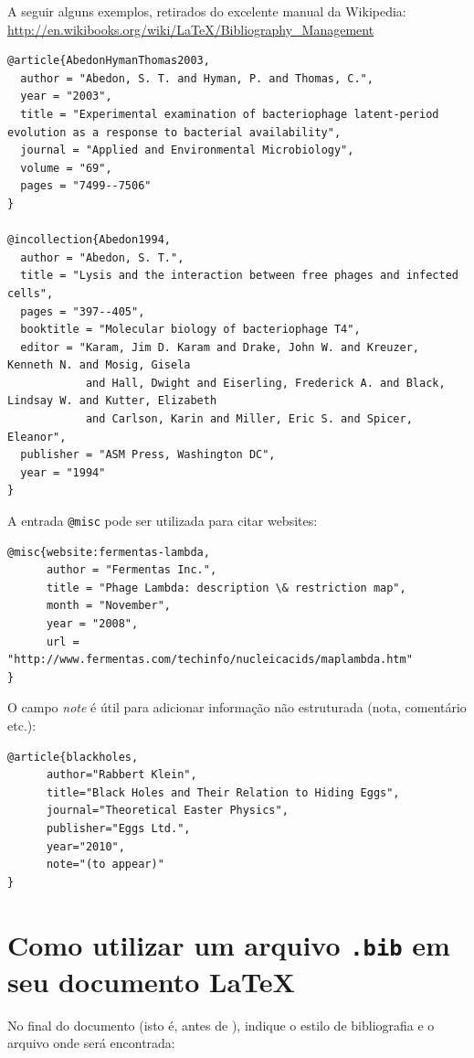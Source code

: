 A seguir alguns exemplos, retirados do excelente manual da Wikipedia: \url{http://en.wikibooks.org/wiki/LaTeX/Bibliography_Management}

\begin{verbatim}
@article{AbedonHymanThomas2003,
  author = "Abedon, S. T. and Hyman, P. and Thomas, C.",
  year = "2003",
  title = "Experimental examination of bacteriophage latent-period evolution as a response to bacterial availability",
  journal = "Applied and Environmental Microbiology",
  volume = "69",
  pages = "7499--7506"
}

@incollection{Abedon1994,
  author = "Abedon, S. T.",
  title = "Lysis and the interaction between free phages and infected cells",
  pages = "397--405",
  booktitle = "Molecular biology of bacteriophage T4",
  editor = "Karam, Jim D. Karam and Drake, John W. and Kreuzer, Kenneth N. and Mosig, Gisela
            and Hall, Dwight and Eiserling, Frederick A. and Black, Lindsay W. and Kutter, Elizabeth
            and Carlson, Karin and Miller, Eric S. and Spicer, Eleanor",
  publisher = "ASM Press, Washington DC",
  year = "1994"
}
\end{verbatim}

A entrada \verb+@misc+ pode ser utilizada para citar websites:

\begin{verbatim}
@misc{website:fermentas-lambda,
      author = "Fermentas Inc.",
      title = "Phage Lambda: description \& restriction map",
      month = "November",
      year = "2008",
      url = "http://www.fermentas.com/techinfo/nucleicacids/maplambda.htm"
}
\end{verbatim}

O campo \textit{note} é útil para adicionar informação não estruturada (nota, comentário etc.):

\begin{verbatim}
@article{blackholes,
      author="Rabbert Klein",
      title="Black Holes and Their Relation to Hiding Eggs",
      journal="Theoretical Easter Physics",
      publisher="Eggs Ltd.",
      year="2010",
      note="(to appear)"
}
\end{verbatim}

\section{Como utilizar um arquivo \texttt{.bib} em seu documento \LaTeX}

No final do documento (isto é, antes de \verb++), indique o estilo de bibliografia e o arquivo onde será encontrada:

